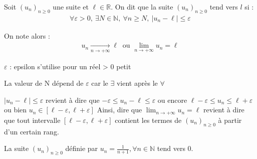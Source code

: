 \begin{graybox}
    \begin{definition}[]
    \par Soit $(u_n)_{n \geqslant 0}$ une suite et $\ell \in \mathbb{R}$. On dit que la suite $(u_n)_{n \geqslant 0}$ tend vers $l$ si :
    \begin{align*}
    \forall \varepsilon > 0,\ \exists N \in \mathbb{N},\ \forall n \geqslant N,\ |u_n - \ell| \leqslant \varepsilon
    \end{align*}
    \par On note alors :
    \begin{align*}
    u_n \xrightarrow[n \to +\infty]{}\ell \ \text{ ou }\lim_{n \to +\infty} u_n = \ell
    \end{align*}
\end{definition}
\end{graybox}



    \begin{remarque}
    $\varepsilon$ : epsilon s'utilise pour un réel > 0 petit
\end{remarque}



    \begin{remarque}
    La valeur de N dépend de $\varepsilon$ car le $\exists$ vient après le $\forall$
\end{remarque}



    \begin{remarque}
    $|u_n - \ell| \leqslant \varepsilon$ revient à dire que $-\varepsilon \leqslant u_n - \ell \leqslant \varepsilon$
    ou encore $\ell - \varepsilon \leqslant u_n \leqslant \ell + \varepsilon$
    ou bien $u_n \in [\ell - \varepsilon, \ell + \varepsilon]$
    Ainsi, dire que  $\displaystyle{\lim_{n \to +\infty} u_n = \ell}$ revient à dire que tout intervalle $[\ell-\varepsilon, \ell + \varepsilon]$ contient les termes de $(u_n)_{n \geqslant 0}$ à partir d'un certain rang.
\end{remarque}



    \begin{exemple}
    La suite $(u_n)_{n \geqslant 0}$ définie par $u_n = \frac{1}{n+1}, \forall n \in \mathbb{N}$ tend vers 0.
\end{exemple}



